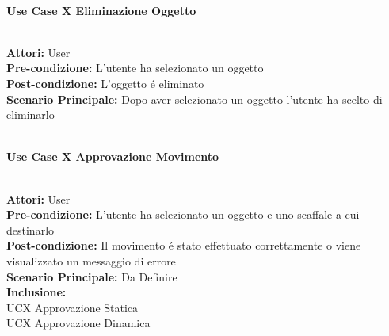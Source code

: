 \vspace{0.5cm}

\Large\textbf{}\\
\Large\textbf{Use Case X Eliminazione Oggetto} \\

\vspace{0.5cm}

\large\textbf{} \\
\textbf{Attori:} User\\
\textbf{Pre-condizione:} L'utente ha selezionato un oggetto  \\
\textbf{Post-condizione: } L'oggetto é eliminato\\
\textbf{Scenario Principale:}  Dopo aver selezionato un oggetto l'utente ha scelto di eliminarlo \\

\vspace{0.5cm}

\Large\textbf{}\\
\Large\textbf{Use Case X Approvazione Movimento} \\

\vspace{0.5cm}

\large\textbf{} \\
\textbf{Attori:} User\\
\textbf{Pre-condizione:} L'utente ha selezionato un oggetto e uno scaffale a cui destinarlo \\
\textbf{Post-condizione: } Il movimento é stato effettuato correttamente o viene visualizzato un messaggio di errore\\
\textbf{Scenario Principale:} Da Definire \\
\textbf{Inclusione:} \\
UCX Approvazione Statica \\
UCX Approvazione Dinamica \\

\vspace{0.5cm}

\textbf{}\\
{} \\
{}\\